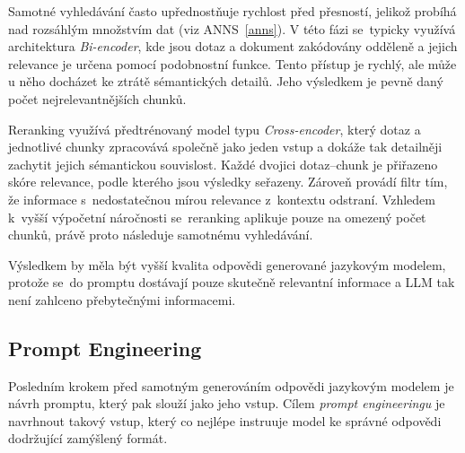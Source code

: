 Samotné vyhledávání často upřednostňuje rychlost před přesností, jelikož probíhá nad rozsáhlým množstvím dat (viz ANNS~\ref{anns}). V této fázi se~typicky využívá architektura \textit{Bi-encoder}, kde jsou dotaz a dokument zakódovány odděleně a jejich relevance je určena pomocí podobnostní funkce. Tento přístup je rychlý, ale může u něho docházet ke ztrátě sémantických detailů. Jeho výsledkem je pevně daný počet nejrelevantnějších chunků.

Reranking využívá předtrénovaný model typu \textit{Cross-encoder}, který dotaz a jednotlivé chunky zpracovává společně jako jeden vstup a dokáže tak detailněji zachytit jejich sémantickou souvislost. Každé dvojici dotaz–chunk je přiřazeno skóre relevance, podle kterého jsou výsledky seřazeny. Zároveň provádí filtr tím, že informace s~nedostatečnou mírou relevance z~kontextu odstraní. Vzhledem k~vyšší výpočetní náročnosti se~reranking aplikuje pouze na omezený počet chunků, právě proto následuje samotnému vyhledávání.

Výsledkem by měla být vyšší kvalita odpovědi generované jazykovým modelem, protože se~do promptu dostávají pouze skutečně relevantní informace a LLM tak není zahlceno přebytečnými informacemi.

\subsection{Prompt Engineering}
Posledním krokem před samotným generováním odpovědi jazykovým modelem je návrh promptu, který pak slouží jako jeho vstup. Cílem \textit{prompt engineeringu} je navrhnout takový vstup, který co nejlépe instruuje model ke správné odpovědi dodržující zamýšlený formát.

